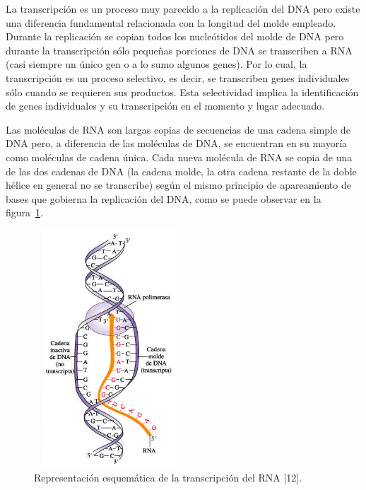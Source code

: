 La transcripción es un proceso muy parecido a la replicación del DNA pero existe una diferencia fundamental relacionada con la longitud del molde empleado. Durante la replicación se copian todos los nucleótidos del molde de DNA pero durante la transcripción sólo pequeñas porciones de DNA se transcriben a RNA (casi siempre un único gen o a lo sumo algunos genes). Por lo cual, la transcripción es un proceso selectivo, es decir, se transcriben genes individuales sólo cuando se requieren sus productos. Esta selectividad implica la identificación de genes individuales y su transcripción en el momento y lugar adecuado.

\par Las moléculas de RNA son largas copias de secuencias de una cadena simple de DNA pero, a diferencia de las moléculas de DNA, se encuentran en su mayoría como moléculas de cadena única. Cada nueva molécula de RNA se copia de una de las dos cadenas de DNA (la cadena molde, la otra cadena restante de la doble hélice en general no se transcribe) según el mismo principio de apareamiento de bases que gobierna la replicación del DNA, como se puede observar en la figura~\ref{transcripcion}. 

\begin{figure} [h]
	\hspace*{3.5cm}\includegraphics[width=2.2209in,height=3.5000in]{image/transcripcion.jpg}
	\caption{Representación esquemática de la transcripción del RNA [12].}
	\label{transcripcion}
\end{figure}				


